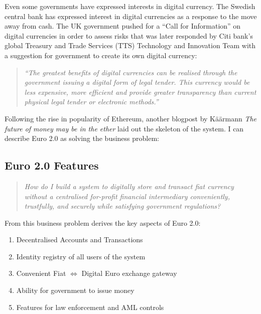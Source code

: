 \documentclass[12pt]{article} %
\begin{document}
{{Even some governments have expressed interests in digital currency. The Swedish central bank has expressed interest in digital currencies as a response to the move away from cash\cite{milne2016sweden}. The UK government pushed for a ``Call for Information'' on digital currencies in order to assess risks\cite{nermin2014ukcall} that was later responded by Citi bank's global Treasury and Trade Services (TTS) Technology and Innovation Team with a suggestion for government to create its own digital currency\cite{spaven2015ukcurrency}:

\begin{quotation}
	\textit{``The greatest benefits of digital currencies can be realised through the government issuing a digital form of legal tender. This currency would be less expensive, more efficient and provide greater transparency than current physical legal tender or electronic methods.''}
\end{quotation}

Following the rise in popularity of Ethereum, another blogpost by Käärmann \textit{The future of money may be in the ether}\cite{kaarmann2016ether} laid out the skeleton of the system. I can describe Euro 2.0 as solving the business problem:

\subsection{Euro 2.0 Features} \label{ssec:3.3}

\begin{quotation}
	\textit{How do I build a system to digitally store and transact fiat currency without a centralised for-profit financial intermediary conveniently, trustfully, and securely while satisfying government regulations?}
\end{quotation}

From this business problem derives the key aspects of Euro 2.0:

\begin{enumerate}
	\item Decentralised Accounts and Transactions
	\item Identity registry of all users of the system
	\item Convenient Fiat $\Longleftrightarrow$ Digital Euro exchange gateway
	\item Ability for government to issue money
	\item Features for law enforcement and AML controls
\end{enumerate}

}}
\end{document}
